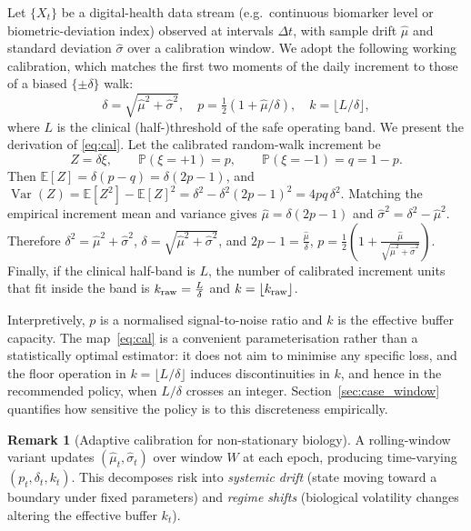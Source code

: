 \documentclass[pdflatex,sn-mathphys-num]{sn-jnl}
\theoremstyle{definition}
\newtheorem{remark}[theorem]{Remark}
\DeclareMathOperator{\Var}{Var}
\newcommand{\Prob}{\mathbb{P}}
\newcommand{\E}{\mathbb{E}}
\numberwithin{equation}{section}
\begin{document}
Let $\{X_t\}$ be a digital-health data stream (e.g.\ continuous biomarker level or biometric-deviation index) observed at intervals $\Delta t$, with sample drift $\hat\mu$ and standard deviation $\hat\sigma$ over a calibration window. We adopt the following working calibration, which matches the first two moments of the daily increment to those of a biased $\{\pm\delta\}$ walk:
\begin{equation}\label{eq:cal}
\delta = \sqrt{\hat\mu^2{+}\hat\sigma^2},\quad
p = \tfrac{1}{2}(1{+}\hat\mu/\delta),\quad
k = \lfloor L/\delta\rfloor,
\end{equation}
where $L$ is the clinical (half-)threshold of the safe operating band. 
We present the derivation of \eqref{eq:cal}. Let the calibrated random-walk increment be
\[
Z=\delta \xi,\qquad 
\Prob(\xi=+1)=p,\qquad \Prob(\xi=-1)=q=1-p.
\]
Then
$\displaystyle \E[Z]=\delta(p-q)=\delta(2p-1)$,
and
$\displaystyle \Var(Z)=\E[Z^2]-\E[Z]^2
=\delta^2-\delta^2(2p-1)^2
=4pq\,\delta^2$.
Matching the empirical increment mean and variance gives
$\displaystyle \hat\mu=\delta(2p-1)$ and
$\displaystyle \hat\sigma^2=\delta^2-\hat\mu^2$.
Therefore
$\displaystyle \delta^2=\hat\mu^2+\hat\sigma^2$,
$\displaystyle \delta=\sqrt{\hat\mu^2+\hat\sigma^2}$,
and
$2p-1=\frac{\hat\mu}{\delta}$,
$p=\frac12\left(1+\frac{\hat\mu}{\sqrt{\hat\mu^2+\hat\sigma^2}}\right)$.
Finally, if the clinical half-band is \(L\), the number of calibrated
increment units that fit inside the band is
$k_{\rm raw}=\frac{L}{\delta}$ and 
$k=\lfloor k_{\rm raw}\rfloor$.

Interpretively, $p$ is a normalised signal-to-noise ratio and $k$ is the effective buffer capacity. The map~\eqref{eq:cal} is a convenient parameterisation rather than a statistically optimal estimator: it does not aim to minimise any specific loss, and the floor operation in $k=\lfloor L/\delta\rfloor$ induces discontinuities in $k$, and hence in the recommended policy, when $L/\delta$ crosses an integer. Section~\ref{sec:case_window} quantifies how sensitive the policy is to this discreteness empirically.

\begin{remark}[Adaptive calibration for non-stationary biology]
A rolling-window variant updates $(\hat\mu_t,\hat\sigma_t)$ over window $W$ at each epoch, producing time-varying $(p_t,\delta_t,k_t)$. This decomposes risk into \emph{systemic drift} (state moving toward a boundary under fixed parameters) and \emph{regime shifts} (biological volatility changes altering the effective buffer $k_t$).
\end{remark}
\end{document}
